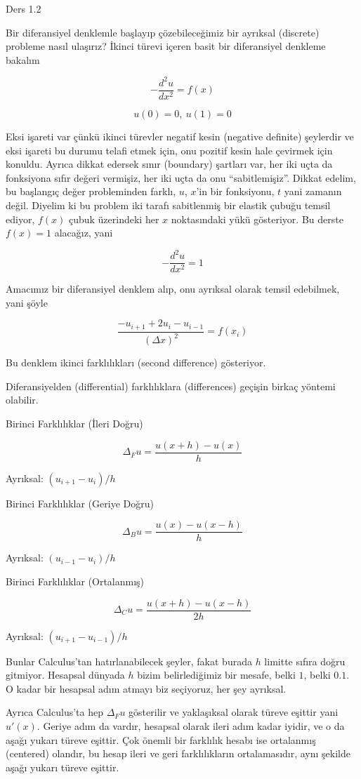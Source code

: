 \documentclass[12pt,fleqn]{article}\usepackage{../../common}
\begin{document}
Ders 1.2

Bir diferansiyel denklemle başlayıp çözebileceğimiz bir ayrıksal (discrete)
probleme nasıl ulaşırız? İkinci türevi içeren basit bir diferansiyel
denkleme bakalım

$$ -\frac{d^2u}{dx^2} = f(x) $$

$$ u(0) = 0, \ u(1) = 0 $$

Eksi işareti var çünkü ikinci türevler negatif kesin (negative definite)
şeylerdir ve eksi işareti bu durumu telafi etmek için, onu pozitif kesin
hale çevirmek için konuldu. Ayrıca dikkat edersek sınır (boundary) şartları
var, her iki uçta da fonksiyona sıfır değeri vermişiz, her iki uçta da onu
``sabitlemişiz''. Dikkat edelim, bu başlangıç değer probleminden farklı,
$u$, $x$'in bir fonksiyonu, $t$ yani zamanın değil. Diyelim ki bu problem
iki tarafı sabitlenmiş bir elastik çubuğu temsil ediyor, $f(x)$ çubuk
üzerindeki her $x$ noktasındaki yükü gösteriyor. Bu derste $f(x) = 1$
alacağız, yani

$$ -\frac{d^2u}{dx^2} = 1 $$

Amacımız bir diferansiyel denklem alıp, onu ayrıksal olarak temsil edebilmek,
yani şöyle

$$ \frac{-u_{i+1}+2u_i - u_{i-1}}{(\Delta x)^2} = f(x_i)$$

Bu denklem ikinci farklılıkları (second difference) gösteriyor. 

Diferansiyelden (differential) farklılıklara (differences) geçişin birkaç
yöntemi olabilir. 

Birinci Farklılıklar (İleri Doğru)

$$ \Delta_Fu = \frac{u(x+h)-u(x)}{h} $$

Ayrıksal: $(u_{i+1} - u_{i}) / h$

Birinci Farklılıklar (Geriye Doğru)

$$ \Delta_Bu = \frac{u(x)-u(x-h)}{h} $$

Ayrıksal: $(u_{i-1} - u_{i}) / h$

Birinci Farklılıklar (Ortalanmış)

$$ \Delta_Cu = \frac{u(x+h)-u(x-h)}{2h} $$

Ayrıksal: $(u_{i+1} - u_{i-1}) / h$

Bunlar Calculus'tan hatırlanabilecek şeyler, fakat burada $h$ limitte
sıfıra doğru gitmiyor. Hesapsal dünyada $h$ bizim belirlediğimiz bir
mesafe, belki $1$, belki $0.1$. O kadar bir hesapsal adım atmayı biz
seçiyoruz, her şey ayrıksal. 

Ayrıca Calculus'ta hep $\Delta_F u$ gösterilir ve yaklaşıksal olarak türeve
eşittir yani $u'(x)$. Geriye adım da vardır, hesapsal olarak ileri adım
kadar iyidir, ve o da aşağı yukarı türeve eşittir. Çok önemli bir farklılık
hesabı ise ortalanmış (centered) olandır, bu hesap ileri ve geri
farklılıkların ortalamasıdır, aynı şekilde aşağı yukarı türeve eşittir.
\end{document}

